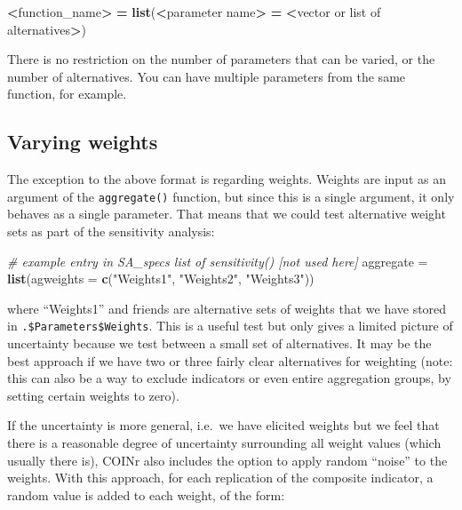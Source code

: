 \documentclass[
]{book}
\newenvironment{Shaded}{\begin{snugshade}}{\end{snugshade}}
\newcommand{\CommentTok}[1]{\textcolor[rgb]{0.56,0.35,0.01}{\textit{#1}}}
\newcommand{\DataTypeTok}[1]{\textcolor[rgb]{0.13,0.29,0.53}{#1}}
\newcommand{\ErrorTok}[1]{\textcolor[rgb]{0.64,0.00,0.00}{\textbf{#1}}}
\newcommand{\KeywordTok}[1]{\textcolor[rgb]{0.13,0.29,0.53}{\textbf{#1}}}
\newcommand{\NormalTok}[1]{#1}
\newcommand{\OperatorTok}[1]{\textcolor[rgb]{0.81,0.36,0.00}{\textbf{#1}}}
\newcommand{\StringTok}[1]{\textcolor[rgb]{0.31,0.60,0.02}{#1}}
\begin{document}
\begin{Shaded}
\begin{Highlighting}[]
\OperatorTok{<}\NormalTok{function_name}\OperatorTok{>}\StringTok{ }\ErrorTok{=}\StringTok{ }\KeywordTok{list}\NormalTok{(}\OperatorTok{<}\NormalTok{parameter name}\OperatorTok{>}\StringTok{ }\ErrorTok{=}\StringTok{ }\ErrorTok{<}\NormalTok{vector or list of alternatives}\OperatorTok{>}\NormalTok{)}
\end{Highlighting}
\end{Shaded}

There is no restriction on the number of parameters that can be varied, or the number of alternatives. You can have multiple parameters from the same function, for example.

\hypertarget{varying-weights}{%
\subsection{Varying weights}\label{varying-weights}}

The exception to the above format is regarding weights. Weights are input as an argument of the \texttt{aggregate()} function, but since this is a single argument, it only behaves as a single parameter. That means that we could test alternative weight sets as part of the sensitivity analysis:

\begin{Shaded}
\begin{Highlighting}[]
\CommentTok{# example entry in SA_specs list of sensitivity() [not used here]}
\NormalTok{aggregate =}\StringTok{ }\KeywordTok{list}\NormalTok{(}\DataTypeTok{agweights =} \KeywordTok{c}\NormalTok{(}\StringTok{"Weights1"}\NormalTok{, }\StringTok{"Weights2"}\NormalTok{, }\StringTok{"Weights3"}\NormalTok{))}
\end{Highlighting}
\end{Shaded}

where ``Weights1'' and friends are alternative sets of weights that we have stored in \texttt{.\$Parameters\$Weights}. This is a useful test but only gives a limited picture of uncertainty because we test between a small set of alternatives. It may be the best approach if we have two or three fairly clear alternatives for weighting (note: this can also be a way to exclude indicators or even entire aggregation groups, by setting certain weights to zero).

If the uncertainty is more general, i.e.~we have elicited weights but we feel that there is a reasonable degree of uncertainty surrounding all weight values (which usually there is), COINr also includes the option to apply random ``noise'' to the weights. With this approach, for each replication of the composite indicator, a random value is added to each weight, of the form:
\end{document}
